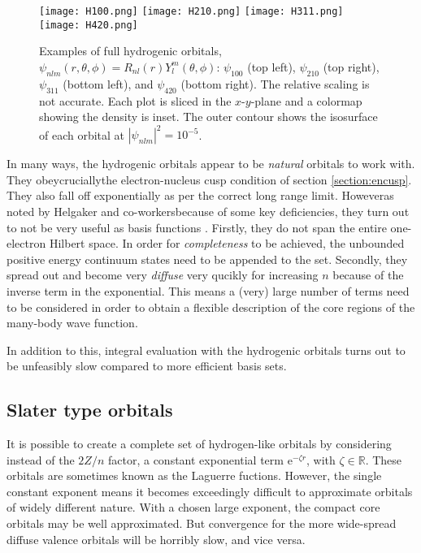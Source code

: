\documentclass[../../master.tex]{subfiles}
\begin{document}
\begin{figure}
\centering
\texttt{[image: H100.png]}
\texttt{[image: H210.png]}
\texttt{[image: H311.png]}
\texttt{[image: H420.png]}
\caption{Examples of full hydrogenic orbitals, $\psi_{nlm}(r,\theta,\phi)=R_{nl}(r)Y^m_l(\theta,\phi)$: $\psi_{100}$ (top left), $\psi_{210}$ (top right), $\psi_{311}$ (bottom left), and $\psi_{420}$ (bottom right). The relative scaling is not accurate. Each plot is sliced in the $x$-$y$-plane and a colormap showing the density is inset. The outer contour shows the isosurface of each orbital at $|\psi_{nlm}|^2=10^{-5}$. \label{fig:hydrogenorbital3d}}
\end{figure}

In many ways, the hydrogenic orbitals appear to be \emph{natural} orbitals to work with. They obey\textemdash crucially\textemdash the electron-nucleus cusp condition of section \ref{section:encusp}. They also fall off exponentially as per the correct long range limit. However\textemdash as noted by Helgaker and co-workers\textemdash because of some key deficiencies, they turn out to not be very useful as basis functions \cite{helgaker}. Firstly, they do not span the entire one-electron Hilbert space. In order for \emph{completeness} to be achieved, the unbounded positive energy continuum states need to be appended to the set. Secondly, they spread out and become very \emph{diffuse} very qucikly for increasing $n$ because of the inverse term in the exponential. This means a (very) large number of terms need to be considered in order to obtain a flexible description of the core regions of the many-body wave function. 

In addition to this, integral evaluation with the hydrogenic orbitals turns out to be unfeasibly slow compared to more efficient basis sets. 

\subsection{Slater type orbitals}
It is possible to create a complete set of hydrogen-like orbitals by considering instead of the $2Z/n$ factor, a constant exponential term $\mathrm{e}^{-\zeta r}$, with $\zeta\in\mathbb{R}$. These orbitals are sometimes known as the Laguerre fuctions. However, the single constant exponent means it becomes exceedingly difficult to approximate orbitals of widely different nature. With a chosen large exponent, the compact core orbitals may be well approximated. But convergence for the more wide-spread diffuse valence orbitals will be horribly slow, and vice versa.
\end{document}
